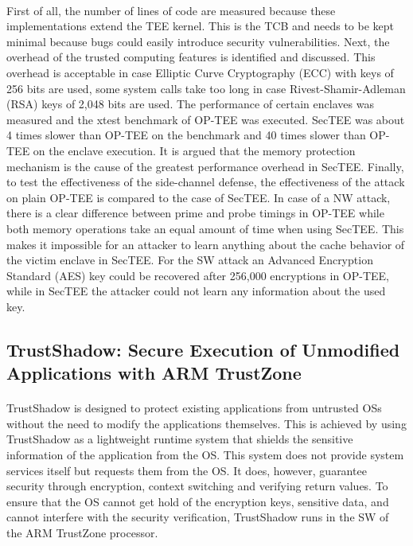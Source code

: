 \paragraph*{}
First of all, the number of lines of code are measured because these implementations extend the TEE kernel. This is the TCB and needs to be kept minimal because bugs could easily introduce security vulnerabilities. Next, the overhead of the trusted computing features is identified and discussed. This overhead is acceptable in case Elliptic Curve Cryptography (ECC) with keys of 256 bits are used, some system calls take too long in case Rivest-Shamir-Adleman (RSA) keys of 2,048 bits are used. The performance of certain enclaves was measured and the xtest benchmark of OP-TEE was executed. SecTEE was about 4 times slower than OP-TEE on the benchmark and 40 times slower than OP-TEE on the enclave execution. It is argued that the memory protection mechanism is the cause of the greatest performance overhead in SecTEE. Finally, to test the effectiveness of the side-channel defense, the effectiveness of the attack on plain OP-TEE is compared to the case of SecTEE. In case of a NW attack, there is a clear difference between prime and probe timings in OP-TEE while both memory operations take an equal amount of time when using SecTEE. This makes it impossible for an attacker to learn anything about the cache behavior of the victim enclave in SecTEE. For the SW attack an Advanced Encryption Standard (AES) key could be recovered after 256,000 encryptions in OP-TEE, while in SecTEE the attacker could not learn any information about the used key.

\subsection*{TrustShadow: Secure Execution of Unmodified Applications with ARM TrustZone}

\paragraph*{}
TrustShadow \cite{GuanLe2017TSEo} is designed to protect existing applications from untrusted OSs without the need to modify the applications themselves. This is achieved by using TrustShadow as a lightweight runtime system that shields the sensitive information of the application from the OS. This system does not provide system services itself but requests them from the OS. It does, however, guarantee security through encryption, context switching and verifying return values. To ensure that the OS cannot get hold of the encryption keys, sensitive data, and cannot interfere with the security verification, TrustShadow runs in the SW of the ARM TrustZone processor.

